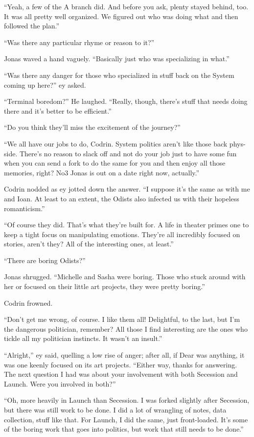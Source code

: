 ``Yeah, a few of the A branch did. And before you ask, plenty stayed behind, too. It was all pretty well organized. We figured out who was doing what and then followed the plan.''

``Was there any particular rhyme or reason to it?''

Jonas waved a hand vaguely. ``Basically just who was specializing in what.''

``Was there any danger for those who specialized in stuff back on the System coming up here?'' ey asked.

``Terminal boredom?'' He laughed. ``Really, though, there's stuff that needs doing there and it's better to be efficient.''

``Do you think they'll miss the excitement of the journey?''

``We all have our jobs to do, Codrin. System politics aren't like those back phys-side. There's no reason to slack off and not do your job just to have some fun when you can send a fork to do the same for you and then enjoy all those memories, right? No3 Jonas is out on a date right now, actually.''

Codrin nodded as ey jotted down the answer. ``I suppose it's the same as with me and Ioan. At least to an extent, the Odists also infected us with their hopeless romanticism.''

``Of course they did. That's what they're built for. A life in theater primes one to keep a tight focus on manipulating emotions. They're all incredibly focused on stories, aren't they? All of the interesting ones, at least.''

``There are boring Odists?''

Jonas shrugged. ``Michelle and Sasha were boring. Those who stuck around with her or focused on their little art projects, they were pretty boring.''

Codrin frowned.

``Don't get me wrong, of course. I like them all! Delightful, to the last, but I'm the dangerous politician, remember? All those I find interesting are the ones who tickle all my politician instincts. It wasn't an insult.''

``Alright,'' ey said, quelling a low rise of anger; after all, if Dear was anything, it was one keenly focused on its art projects. ``Either way, thanks for answering. The next question I had was about your involvement with both Secession and Launch. Were you involved in both?''

``Oh, more heavily in Launch than Secession. I was forked slightly after Secession, but there was still work to be done. I did a lot of wrangling of notes, data collection, stuff like that. For Launch, I did the same, just front-loaded. It's some of the boring work that goes into politics, but work that still needs to be done.''

